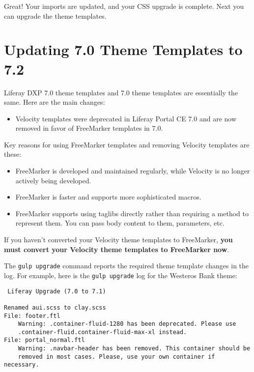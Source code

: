 \noindent\hrulefill

Great! Your imports are updated, and your CSS upgrade is complete. Next
you can upgrade the theme templates.

\chapter{Updating 7.0 Theme Templates to
7.2}\label{updating-7.0-theme-templates-to-7.2}

Liferay DXP 7.0 theme templates and 7.0 theme templates are essentially
the same. Here are the main changes:

\begin{itemize}
\tightlist
\item
  Velocity templates were deprecated in Liferay Portal CE 7.0 and are
  now removed in favor of FreeMarker templates in 7.0.
\end{itemize}

Key reasons for using FreeMarker templates and removing Velocity
templates are these:

\begin{itemize}
\item
  FreeMarker is developed and maintained regularly, while Velocity is no
  longer actively being developed.
\item
  FreeMarker is faster and supports more sophisticated macros.
\item
  FreeMarker supports using taglibs directly rather than requiring a
  method to represent them. You can pass body content to them,
  parameters, etc.
\end{itemize}

If you haven't converted your Velocity theme templates to FreeMarker,
\textbf{you must convert your Velocity theme templates to FreeMarker
now}.

The \texttt{gulp\ upgrade} command reports the required theme template
changes in the log. For example, here is the \texttt{gulp\ upgrade} log
for the Westeros Bank theme:

\begin{verbatim}
 Liferay Upgrade (7.0 to 7.1)

Renamed aui.scss to clay.scss
File: footer.ftl
    Warning: .container-fluid-1280 has been deprecated. Please use 
    .container-fluid.container-fluid-max-xl instead.
File: portal_normal.ftl
    Warning: .navbar-header has been removed. This container should be 
    removed in most cases. Please, use your own container if necessary.
\end{verbatim}

